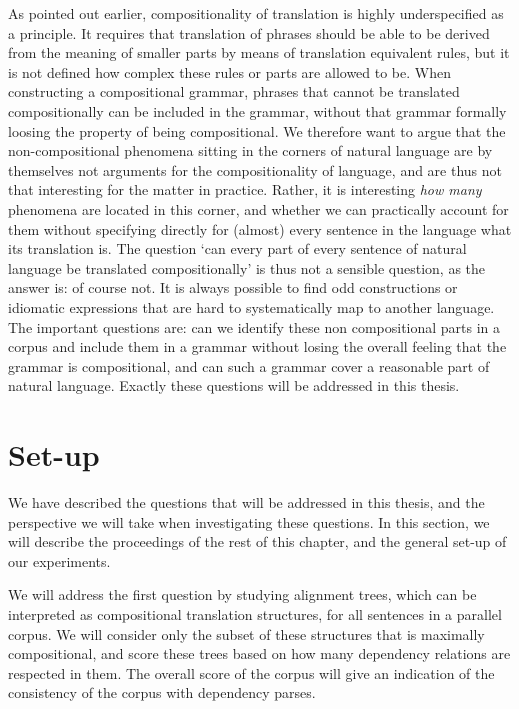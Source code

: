 As pointed out earlier, compositionality  of translation is highly underspecified as a principle. It requires that translation of phrases should be able to be derived from the meaning of smaller parts by means of translation equivalent rules, but it is not defined how complex these rules or parts are allowed to be. When constructing a compositional grammar, phrases that cannot be translated compositionally can be included in the grammar, without that grammar formally loosing the property of being compositional. We therefore want to argue that the non-compositional phenomena sitting in the corners of natural language are by themselves not arguments for the compositionality of language, and are thus not that interesting for the matter in practice. Rather, it is interesting \textit{how many} phenomena are located in this corner, and whether we can practically account for them without specifying directly for (almost) every sentence in the language what its translation is. The question `can every part of every sentence of natural language be translated compositionally' is thus not a sensible question, as the answer is: of course not. It is always possible to find odd constructions or idiomatic expressions that are hard to systematically map to another language. The important questions are: can we identify these non compositional parts in a corpus and include them in a grammar without losing the overall feeling that the grammar is compositional, and can such a grammar cover a reasonable part of natural language. Exactly these questions will be addressed in this thesis.

\section{Set-up}
\label{sec:setup}

We have described the questions that will be addressed in this thesis, and the perspective we will take when investigating these questions. In this section, we will describe the proceedings of the rest of this chapter, and the general set-up of our experiments.

We will address the first question by studying alignment trees, which can be interpreted as compositional translation structures, for all sentences in a parallel corpus. We will consider only the subset of these structures that is maximally compositional, and score these trees based on how many dependency relations are respected in them. The overall score of the corpus will give an indication of the consistency of the corpus with dependency parses.

